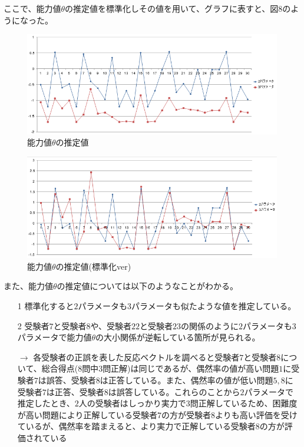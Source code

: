 \documentclass[12pt]{jarticle}
\numberwithin{equation}{subsection}
\begin{document}
ここで、能力値$\theta$の推定値を標準化しその値を用いて、グラフに表すと、図$8$のようになった。
\vspace{3cm}
\begin{figure}[H]
  \centering
  \includegraphics[bb = 550 100 1 1,scale = 0.7]{maxmin_theta.png}
  \vspace{2cm}
  \caption{能力値$\theta$の推定値}
\end{figure}
\vspace{4cm}
\begin{figure}[H]
  \centering
  \includegraphics[bb = 550 100 1 1,scale = 0.7]{bay2bay3.png}
  \vspace{2cm}
  \caption{能力値$\theta$の推定値(標準化ver)}
\end{figure}
また、能力値$\theta$の推定値については以下のようなことがわかる。
\begin{itemize}
  \item[1] 標準化すると$2$パラメータも$3$パラメータも似たような値を推定している。
  \item[2] 受験者$7$と受験者$8$や、受験者$22$と受験者$23$の関係のように$2$パラメータも$3$パラメータで能力値$\theta$の大小関係が逆転している箇所が見られる。
  \item[$\rightarrow$] 各受験者の正誤を表した反応ベクトルを調べると受験者$7$と受験者$8$について、総合得点($8$問中$3$問正解)は同じであるが、偶然率の値が高い問題$1$に受験者$7$は誤答、受験者$8$は正答している。また、偶然率の値が低い問題$5, 8$に受験者$7$は正答、受験者$8$は誤答している。これらのことから$2$パラメータで推定したとき、$2$人の受験者はしっかり実力で$3$問正解しているため、困難度が高い問題により正解している受験者$7$の方が受験者$8$よりも高い評価を受けているが、偶然率を踏まえると、より実力で正解している受験者$8$の方が評価されている
\end{itemize}
\end{document}

